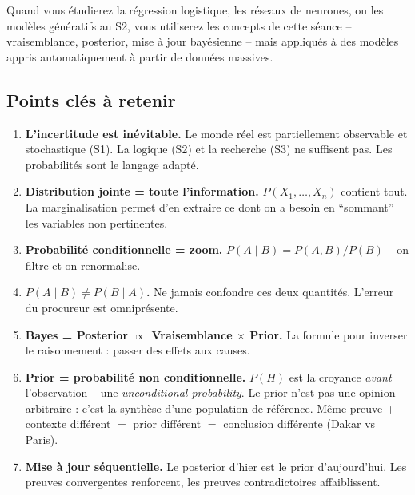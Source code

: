 \documentclass[11pt,a4paper]{article}
\begin{document}
Quand vous étudierez la régression logistique, les réseaux de neurones, ou les modèles génératifs au S2, vous utiliserez les concepts de cette séance -- vraisemblance, posterior, mise à jour bayésienne -- mais appliqués à des modèles appris automatiquement à partir de données massives.

\subsection{Points clés à retenir}

\begin{retenirbox}
\begin{enumerate}
    \item \textbf{L'incertitude est inévitable.} Le monde réel est partiellement observable et stochastique (S1). La logique (S2) et la recherche (S3) ne suffisent pas. Les probabilités sont le langage adapté.
    
    \item \textbf{Distribution jointe = toute l'information.} $P(X_1, \ldots, X_n)$ contient tout. La marginalisation permet d'en extraire ce dont on a besoin en ``sommant'' les variables non pertinentes.
    
    \item \textbf{Probabilité conditionnelle = zoom.} $P(A \mid B) = P(A,B)/P(B)$ -- on filtre et on renormalise.
    
    \item \textbf{$P(A \mid B) \neq P(B \mid A)$.} Ne jamais confondre ces deux quantités. L'erreur du procureur est omniprésente.
    
    \item \textbf{Bayes = Posterior $\propto$ Vraisemblance $\times$ Prior.} La formule pour inverser le raisonnement : passer des effets aux causes.
    
    \item \textbf{Prior = probabilité non conditionnelle.} $P(H)$ est la croyance \textit{avant} l'observation -- une \textit{unconditional probability}. Le prior n'est pas une opinion arbitraire : c'est la synthèse d'une population de référence. Même preuve + contexte différent $=$ prior différent $=$ conclusion différente (Dakar vs Paris).
    
    \item \textbf{Mise à jour séquentielle.} Le posterior d'hier est le prior d'aujourd'hui. Les preuves convergentes renforcent, les preuves contradictoires affaiblissent.
    

\end{enumerate}
\end{retenirbox}
\end{document}
